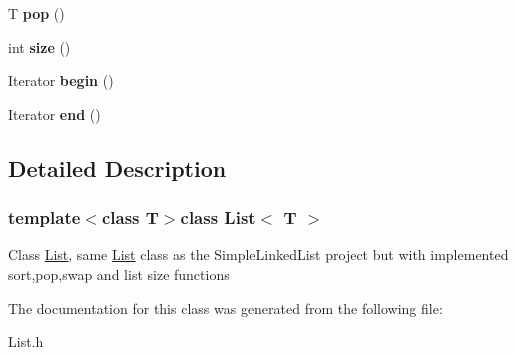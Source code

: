\begin{DoxyCompactItemize}
\item 
\hypertarget{class_list_ad19661456bd18843dfe970b5309e7516}{T {\bfseries pop} ()}\label{class_list_ad19661456bd18843dfe970b5309e7516}

\item 
\hypertarget{class_list_a2497bdf42246d61237aaf046c116183a}{int {\bfseries size} ()}\label{class_list_a2497bdf42246d61237aaf046c116183a}

\item 
\hypertarget{class_list_a3cd86b8318ab6be017fd69a71f1e4874}{Iterator {\bfseries begin} ()}\label{class_list_a3cd86b8318ab6be017fd69a71f1e4874}

\item 
\hypertarget{class_list_ad860fbbcfb2d693ab4f27fd0aa6125ad}{Iterator {\bfseries end} ()}\label{class_list_ad860fbbcfb2d693ab4f27fd0aa6125ad}

\end{DoxyCompactItemize}


\subsection{Detailed Description}
\subsubsection*{template$<$class T$>$class List$<$ T $>$}

Class \hyperlink{class_list}{List}, same \hyperlink{class_list}{List} class as the Simple\-Linked\-List project but with implemented sort,pop,swap and list size functions 

The documentation for this class was generated from the following file\-:\begin{DoxyCompactItemize}
\item 
List.\-h\end{DoxyCompactItemize}
